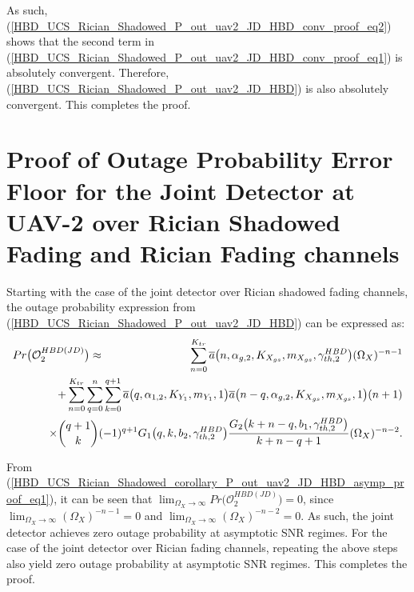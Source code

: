As such, (\ref{HBD_UCS_Rician_Shadowed_P_out_uav2_JD_HBD_conv_proof_eq2}) shows that the second term in (\ref{HBD_UCS_Rician_Shadowed_P_out_uav2_JD_HBD_conv_proof_eq1}) is absolutely convergent. Therefore, (\ref{HBD_UCS_Rician_Shadowed_P_out_uav2_JD_HBD}) is also absolutely convergent. This completes the proof.

\section{Proof of Outage Probability Error Floor for the Joint Detector at UAV-2 over Rician Shadowed Fading and Rician Fading channels} \label{HBD_UCS_Rician_Shadowed_corollary_P_out_uav2_JD_HBD_asymp_proof}
Starting with the case of the joint detector over Rician shadowed fading channels, the outage probability expression from (\ref{HBD_UCS_Rician_Shadowed_P_out_uav2_JD_HBD}) can be expressed as:
\begin{eqnarray} \label{HBD_UCS_Rician_Shadowed_corollary_P_out_uav2_JD_HBD_asymp_proof_eq1}
Pr\big(\mathcal{O}_{2}^{HBD(JD)}\big) & \approx & \sum_{n=0}^{K_{tr}} \overline{a}\big(n,\alpha_{g,2},K_{X_{gs}},m_{X_{gs}},\gamma_{th,2}^{HBD}\big) (\Omega_X)^{-n-1} \nonumber\\
 & & \hspace{-3cm} + \sum_{n=0}^{K_{tr}}\sum_{q=0}^{n}\sum_{k=0}^{q+1} \overline{a}\big(q,\alpha_{1,2},K_{Y_1},m_{Y_1},1\big) \overline{a}\big(n-q,\alpha_{g,2},K_{X_{gs}},m_{X_{gs}},1\big) (n+1) \nonumber\\
 & & \hspace{-2cm} \times \binom{q+1}{k}(-1)^{q+1} G_1\big(q,k,b_2,\gamma_{th,2}^{HBD}\big) \frac{G_2\big(k+n-q,b_1,\gamma_{th,2}^{HBD}\big)}{k+n-q+1} (\Omega_X)^{-n-2}.
\end{eqnarray}

From (\ref{HBD_UCS_Rician_Shadowed_corollary_P_out_uav2_JD_HBD_asymp_proof_eq1}), it can be seen that $\lim_{\Omega_X \to \infty} Pr\big(\mathcal{O}_{2}^{HBD(JD)}\big) = 0$, since $\lim_{\Omega_X \to \infty} (\Omega_X)^{-n-1} = 0$ and $\lim_{\Omega_X \to \infty} (\Omega_X)^{-n-2} = 0$. As such, the joint detector achieves zero outage probability at asymptotic SNR regimes. For the case of the joint detector over Rician fading channels, repeating the above steps also yield zero outage probability at asymptotic SNR regimes. This completes the proof.

